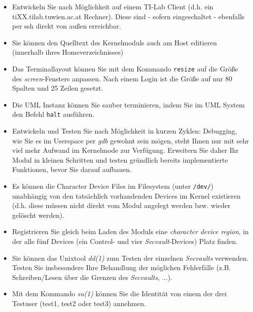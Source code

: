 \documentclass{article}
\begin{document}
\begin{itemize}
\item Entwickeln Sie nach M{\"o}glichkeit auf einem TI-Lab Client
  (d.h. ein tiXX.tilab.tuwien.ac.at Rechner). Diese sind - sofern
  eingeschaltet - ebenfalls per ssh direkt von au{\ss}en erreichbar.
\item Sie k{\"o}nnen den Quelltext des Kernelmoduls auch am Host
  editieren (innerhalb ihres Homeverzeichnisses)
\item Das Terminallayout k{\"o}nnen Sie mit dem Kommando \texttt{resize}
  auf die Gr{\"o}{\ss}e des \emph{screen}-Fensters anpassen.
  Nach einem Login ist die Gr{\"o}{\ss}e auf nur 80 Spalten
  und 25 Zeilen gesetzt.
\item Die UML Instanz k{\"o}nnen Sie sauber terminieren, indem Sie im
  UML System den Befehl \texttt{halt} ausf{\"u}hren.
\item Entwickeln und Testen Sie nach M{\"o}glichkeit in kurzen Zyklen:
  Debugging, wie Sie es im Userspace per \emph{gdb} gewohnt sein
  m{\"o}gen, steht Ihnen nur mit sehr viel mehr Aufwand im Kernelmode
  zur Verf{\"u}gung. Erweitern Sie daher Ihr Modul in kleinen
  Schritten und testen gr{\"u}ndlich bereits implementierte Funktionen,
  bevor Sie darauf aufbauen.
\item Es k{\"o}nnen die Character Device Files im Filesystem (unter \verb|/dev/|)
  unabh{\"a}ngig von den tats{\"a}chlich vorhandenden Devices im
  Kernel existieren (d.h. diese m{\"u}ssen nicht direkt vom Modul
  angelegt werden bzw. wieder gel{\"o}scht werden).
\item Registrieren Sie gleich beim Laden des Moduls eine \emph{character
  device region}, in der alle f{\"u}nf Devices (ein Control- und vier
  \emph{Secvault}-Devices) Platz finden.
\item Sie k{\"o}nnen das Unixtool \emph{dd(1)} zum Testen der
  einzelnen \emph{Secvaults} verwenden. Testen Sie insbesondere Ihre
  Behandlung der m{\"o}glichen Fehlerf{\"a}lle (z.B. Schreiben/Lesen
  {\"u}ber die Grenzen des \emph{Secvaults}, ...).
\item Mit dem Kommando \emph{su(1)} k{\"o}nnen Sie die Identit{\"a}t
  von einem der drei Testuser (test1, test2 oder test3) annehmen.
\end{itemize}
\end{document}
